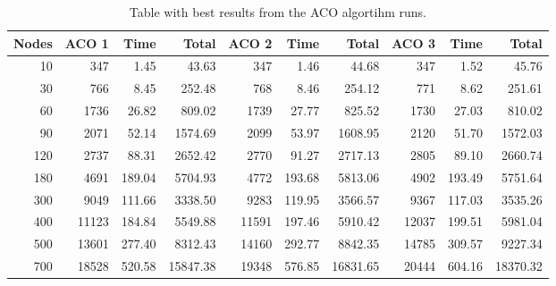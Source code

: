 \documentclass[a4paper]{scrartcl}
\begin{document}
\begin{table}
              \small
    \begin{adjustwidth}{-.5in}{-.5in}  
        \begin{center}
          \begin{tabular}{r | r | r | r | r | r | r | r | r | r}

\hline
Nodes & ACO 1 & Time & Total & ACO 2 & Time & Total & ACO 3 & Time & Total \\
\hline \hline 
10 & 347 & 1.45 & 43.63 & 347 & 1.46 & 44.68 & 347 & 1.52 & 45.76 \\
\hline
30 & 766 & 8.45 & 252.48 & 768 & 8.46 & 254.12 & 771 & 8.62 & 251.61 \\
\hline
60 & 1736 & 26.82 & 809.02 & 1739 & 27.77 & 825.52 & 1730 & 27.03 & 810.02 \\
\hline
90 & 2071 & 52.14 & 1574.69 & 2099 & 53.97 & 1608.95 & 2120 & 51.70 & 1572.03 \\
\hline
120 & 2737 & 88.31 & 2652.42 & 2770 & 91.27 & 2717.13 & 2805 & 89.10 & 2660.74 \\
\hline
180 & 4691 & 189.04 & 5704.93 & 4772 & 193.68 & 5813.06 & 4902 & 193.49 & 5751.64  \\
\hline
300 & 9049 & 111.66 & 3338.50 & 9283 & 119.95 & 3566.57 & 9367 & 117.03 & 3535.26 \\
\hline
400 & 11123 & 184.84 & 5549.88 & 11591 & 197.46 & 5910.42 & 12037 & 199.51 & 5981.04 \\
\hline
500 & 13601 & 277.40 & 8312.43 & 14160 & 292.77 & 8842.35 & 14785 & 309.57 & 9227.34 \\
\hline
700 & 18528 & 520.58 & 15847.38 & 19348 & 576.85 & 16831.65 & 20444 & 604.16 & 18370.32 \\
\hline
\end{tabular}

        \caption{Table with best results from the ACO algortihm runs. }
        \label{myTable2}
        \end{center}
    \end{adjustwidth}
\end{table}



\end{document}

